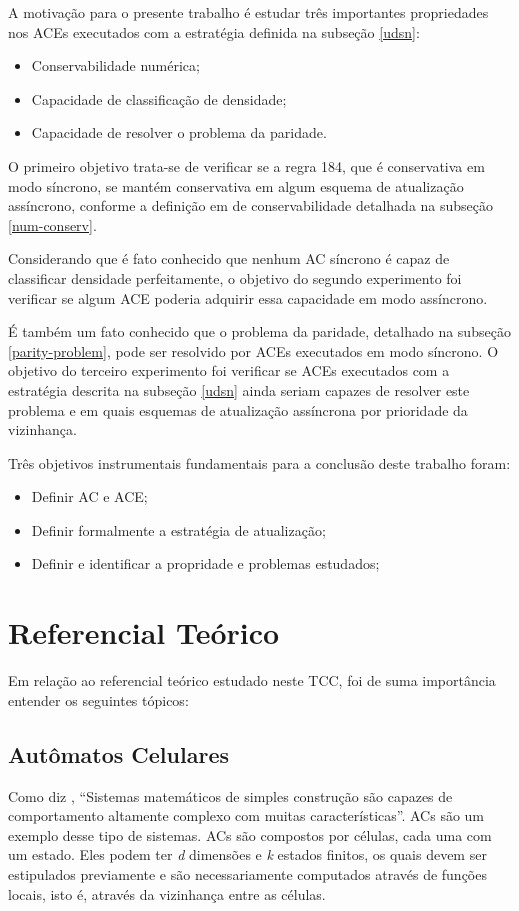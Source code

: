 \documentclass[a4paper,12pt]{ltxdoc}
\newcommand\tab[1][1cm]{\hspace*{#1}}
\begin{document}
A motivação para o presente trabalho é estudar três importantes propriedades nos ACEs executados com a estratégia definida na subseção \ref{udsn}: 

\begin{itemize}
  \item Conservabilidade numérica;
  \item Capacidade de classificação de densidade;
  \item Capacidade de resolver o problema da paridade.
\end{itemize}

\tab O primeiro objetivo trata-se de verificar se a regra 184, que é conservativa em modo síncrono, se mantém conservativa em algum esquema de atualização assíncrono, conforme a definição em de conservabilidade detalhada na subseção \ref{num-conserv}. 

\tab Considerando que é fato conhecido que nenhum AC síncrono é capaz de classificar densidade perfeitamente, o objetivo do segundo experimento foi verificar se algum ACE poderia adquirir essa capacidade em modo assíncrono.

\tab É também um fato conhecido que o problema da paridade, detalhado na subseção \ref{parity-problem}, pode ser resolvido por ACEs executados em modo síncrono. O objetivo do terceiro experimento foi verificar se ACEs executados com a estratégia descrita na subseção \ref{udsn} ainda seriam capazes de resolver este problema e em quais esquemas de atualização assíncrona por prioridade da vizinhança.

\tab Três objetivos instrumentais fundamentais para a conclusão deste trabalho foram:

\begin{itemize}
  \item Definir AC e ACE;
  \item Definir formalmente a estratégia de atualização;
  \item Definir e identificar a propridade e problemas estudados;
\end{itemize}

\section{Referencial Teórico} \label{referencial}
Em relação ao referencial teórico estudado neste TCC, foi de suma importância entender os seguintes tópicos:

\subsection{Autômatos Celulares} \label{ref_ac}
Como diz \cite{wolfram1983cellular}, ``Sistemas matemáticos de simples construção são capazes de comportamento altamente complexo com muitas características''. ACs são um exemplo desse tipo de sistemas. ACs são compostos por células, cada uma com um estado. Eles podem ter \textit{d} dimensões e \textit{k} estados finitos, os quais devem ser estipulados previamente e são necessariamente computados através de funções locais, isto é, através da vizinhança entre as células.
\end{document}
